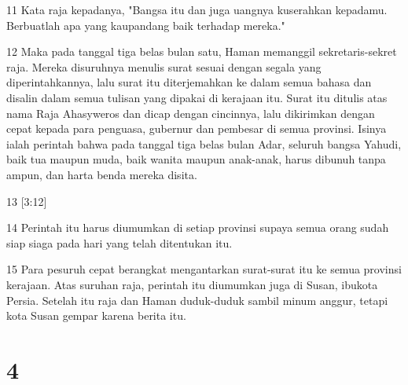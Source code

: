 \par 11 Kata raja kepadanya, "Bangsa itu dan juga uangnya kuserahkan kepadamu. Berbuatlah apa yang kaupandang baik terhadap mereka."
\par 12 Maka pada tanggal tiga belas bulan satu, Haman memanggil sekretaris-sekret raja. Mereka disuruhnya menulis surat sesuai dengan segala yang diperintahkannya, lalu surat itu diterjemahkan ke dalam semua bahasa dan disalin dalam semua tulisan yang dipakai di kerajaan itu. Surat itu ditulis atas nama Raja Ahasyweros dan dicap dengan cincinnya, lalu dikirimkan dengan cepat kepada para penguasa, gubernur dan pembesar di semua provinsi. Isinya ialah perintah bahwa pada tanggal tiga belas bulan Adar, seluruh bangsa Yahudi, baik tua maupun muda, baik wanita maupun anak-anak, harus dibunuh tanpa ampun, dan harta benda mereka disita.
\par 13 [3:12]
\par 14 Perintah itu harus diumumkan di setiap provinsi supaya semua orang sudah siap siaga pada hari yang telah ditentukan itu.
\par 15 Para pesuruh cepat berangkat mengantarkan surat-surat itu ke semua provinsi kerajaan. Atas suruhan raja, perintah itu diumumkan juga di Susan, ibukota Persia. Setelah itu raja dan Haman duduk-duduk sambil minum anggur, tetapi kota Susan gempar karena berita itu.

\chapter{4}


